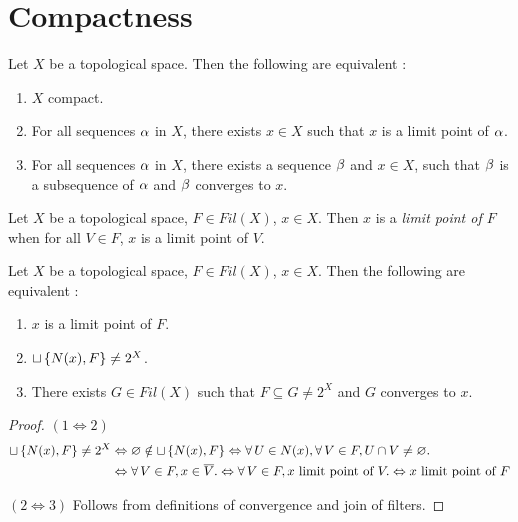 \documentclass[main.tex]{subfiles}
\begin{document}
\section{Compactness}

\begin{rmk}
  
  Let $X$ be a topological space. 
  Then the following are equivalent : 
  \begin{enumerate}
    \item $X$ compact. 
    \item For all sequences $\alpha$ in $X$, 
    there exists $x \in X$ such that $x$ is a limit point of $\alpha$.
    \item For all sequences $\alpha$ in $X$, 
    there exists a sequence $\beta$ and $x \in X$,
    such that $\beta$ is a subsequence of $\alpha$ and $\beta$ converges to $x$.
  \end{enumerate}
\end{rmk}

\begin{dfn} 
  
  Let $X$ be a topological space, $F \in Fil(X)$, $x \in X$.
  Then $x$ is a \emph{limit point of $F$} when
  for all $V \in F$, $x$ is a limit point of $V$.
\end{dfn}

\begin{thm} 
  
  Let $X$ be a topological space, $F \in Fil(X)$, $x \in X$. 
  Then the following are equivalent : 
  \begin{enumerate}
    \item $x$ is a limit point of $F$.
    \item $\sqcup\left\{N(x),F\right\} \neq 2^X$.
    \item There exists $G \in Fil(X)$ such that 
    $F \subseteq G \neq 2^X$ and $G$ converges to $x$.
  \end{enumerate}
\end{thm}
\begin{proof}
  $(1\iff 2)$
  \begin{align*}
    \sqcup\left\{N(x),F\right\} \neq 2^X 
    &\Leftrightarrow \varnothing \notin \sqcup\left\{N(x),F\right\}
    \Leftrightarrow \forall\, U \in N(x), \forall\, V \in F, U \cap V \neq \varnothing. \\
    &\Leftrightarrow \forall\, V \in F, x \in \overline{V}. 
    \Leftrightarrow \forall\, V \in F, x \text{ limit point of } V.
    \Leftrightarrow x \text{ limit point of } F
  \end{align*} 

  $(2\iff 3)$ Follows from definitions of convergence and join of filters.
\end{proof}
\end{document}
